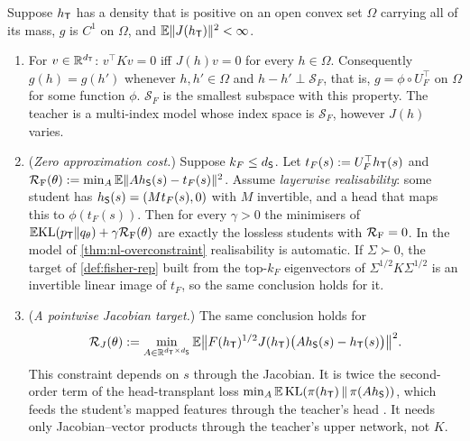\begin{theorem}\label{thm:fisher-central}
\Ck Suppose $h_{\mathsf{T}}$ has a density that is positive on an open convex set $\Omega$ carrying all of its
mass, $g$ is $C^1$ on $\Omega$, and $\mathbb{E}\|J(h_{\mathsf{T}})\|^2<\infty$.
\begin{enumerate}[label=(\roman*),nosep]
\item For $v\in\mathbb{R}^{d_{\mathsf{T}}}$: $v^\top Kv=0$ iff $J(h)v=0$ for every $h\in\Omega$. Consequently $g(h)=g(h')$ whenever $h,h'\in\Omega$ and
$h-h'\perp\mathcal S_F$, that is, $g=\phi\circ U_F^\top$ on $\Omega$ for some function $\phi$. $\mathcal S_F$ is the smallest subspace with
this property. The teacher is a multi-index model whose index space is $\mathcal S_F$, however $J(h)$ varies.
\item (\emph{Zero approximation cost.}) Suppose $k_F\le d_{\mathsf{S}}$. Let $t_F(s):=U_F^\top h_{\mathsf{T}}(s)$ and
$\mathcal{R}_{\mathrm F}(\theta):=\min_A\mathbb{E}\|Ah_{\mathsf{S}}(s)-t_F(s)\|^2$. Assume \emph{layerwise realisability}: some student has
$h_{\mathsf{S}}(s)=(Mt_F(s),0)$ with $M$ invertible, and a head that maps this to $\phi(t_F(s))$. Then for every $\gamma>0$ the minimisers
of $\mathbb{E}\mathrm{KL}(p_{\mathsf{T}}\|q_\theta)+\gamma\mathcal{R}_{\mathrm F}(\theta)$ are exactly the lossless students with $\mathcal{R}_{\mathrm F}=0$. In the model of
\cref{thm:nl-overconstraint} realisability is automatic. If $\Sigma\succ0$, the target of \cref{def:fisher-rep} built from the
top-$k_F$ eigenvectors of $\Sigma^{1/2}K\Sigma^{1/2}$ is an invertible linear image of $t_F$, so the same conclusion holds for it.
\item (\emph{A pointwise Jacobian target.}) The same conclusion holds for
\[
\mathcal{R}_J(\theta):=\min_{A\in\mathbb{R}^{d_{\mathsf{T}}\times d_{\mathsf{S}}}}\mathbb{E}\big\|F(h_{\mathsf{T}})^{1/2}J(h_{\mathsf{T}})\big(Ah_{\mathsf{S}}(s)-h_{\mathsf{T}}(s)\big)\big\|^2 .
\]
This constraint depends on $s$ through the Jacobian. It is twice the second-order term of the head-transplant loss
$\min_A\mathbb{E}\,\mathrm{KL}(\pi(h_{\mathsf{T}})\,\|\,\pi(Ah_{\mathsf{S}}))$, which feeds the student's mapped features through the teacher's head
\citep[cf.][]{chen2022reused}. It needs only Jacobian--vector products through the teacher's upper network, not $K$.
\end{enumerate}
\end{theorem}
